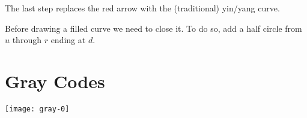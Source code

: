\documentclass{article}
\begin{document}
The last step replaces the red arrow with the (traditional) yin/yang curve.

Before drawing a filled curve we need to close it.
To do so, add a half circle from $u$ through $r$ ending at $d$.

\section{Gray Codes}

\texttt{[image: gray-0]}
\end{document}
